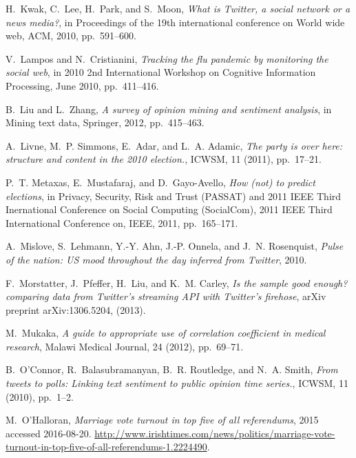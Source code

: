 \documentclass{article}
\begin{document}
\begin{thebibliography}{10}
{\sc H.~Kwak, C.~Lee, H.~Park, and S.~Moon}, {\em What is {T}witter, a social
  network or a news media?}, in Proceedings of the 19th international
  conference on World wide web, ACM, 2010, pp.~591--600.

{\sc V.~Lampos and N.~Cristianini}, {\em Tracking the flu pandemic by
  monitoring the social web}, in 2010 2nd International Workshop on Cognitive
  Information Processing, June 2010, pp.~411--416.

{\sc B.~Liu and L.~Zhang}, {\em A survey of opinion mining and sentiment
  analysis}, in Mining text data, Springer, 2012, pp.~415--463.

{\sc A.~Livne, M.~P. Simmons, E.~Adar, and L.~A. Adamic}, {\em The party is
  over here: structure and content in the 2010 election.}, ICWSM, 11 (2011),
  pp.~17--21.

{\sc P.~T. Metaxas, E.~Mustafaraj, and D.~Gayo-Avello}, {\em How (not) to
  predict elections}, in Privacy, Security, Risk and Trust (PASSAT) and 2011
  IEEE Third Inernational Conference on Social Computing (SocialCom), 2011 IEEE
  Third International Conference on, IEEE, 2011, pp.~165--171.

{\sc A.~Mislove, S.~Lehmann, Y.-Y. Ahn, J.-P. Onnela, and J.~N. Rosenquist},
  {\em {Pulse of the nation: US mood throughout the day inferred from
  Twitter}}, 2010.

{\sc F.~Morstatter, J.~Pfeffer, H.~Liu, and K.~M. Carley}, {\em Is the sample
  good enough? comparing data from {T}witter's streaming {API} with {T}witter's
  firehose}, arXiv preprint arXiv:1306.5204,  (2013).

{\sc M.~Mukaka}, {\em A guide to appropriate use of correlation coefficient in
  medical research}, Malawi Medical Journal, 24 (2012), pp.~69--71.

{\sc B.~O'Connor, R.~Balasubramanyan, B.~R. Routledge, and N.~A. Smith}, {\em
  From tweets to polls: Linking text sentiment to public opinion time series.},
  ICWSM, 11 (2010), pp.~1--2.

{\sc M.~O'Halloran}, {\em Marriage vote turnout in top five of all
  referendums}, 2015 {accessed 2016-08-20}.
\newblock
  \url{http://www.irishtimes.com/news/politics/marriage-vote-turnout-in-top-five-of-all-referendums-1.2224490}.


\end{thebibliography}
\end{document}
